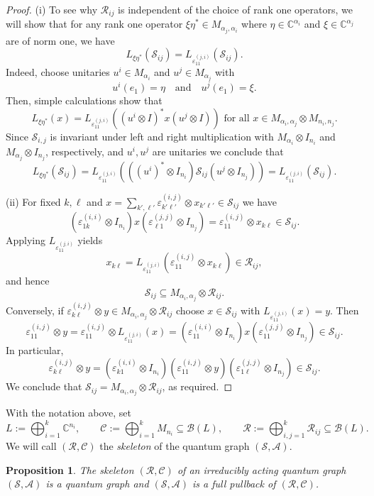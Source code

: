 \documentclass[11pt]{amsart}
\numberwithin{equation}{section}
\theoremstyle{plain}
\newtheorem{proposition}[theorem]{Proposition}
\theoremstyle{definition}
\theoremstyle{remark}
\newcommand{\A}{{\mathcal{A}}}
\newcommand{\B}{{\mathcal{B}}}
\newcommand{\C}{{\mathcal{C}}}
\newcommand{\R}{{\mathcal{R}}}
\renewcommand{\S}{{\mathcal{S}}}
\newcommand{\eps}{\varepsilon}
\def\al{\alpha}
\newcommand{\bC}{\mathbb{C}}
\newcommand{\foral}{\text{ for all }}
\newcommand{\qand}{\quad\text{and}\quad}
\begin{document}
\begin{proof}
(i) To see why $\R_{ij}$ is independent of the choice of rank one operators, we will show that for any rank one operator $ \xi \eta^* \in M_{\al_j,\al_i}$ where $ \eta \in \bC^{\al_i}$ and $ \xi\in \bC^{\al_j}$ are of norm one, we have 
\[
L_{\xi\eta^*}(\S_{ij})= L_{\eps_{11}^{(j,i)}}(\S_{ij}).
\]
Indeed, choose unitaries $ u^i \in M_{\al_i}$ and $u^j \in M_{\al_j}$ with 
\[
u^i (e_1 )=\eta \qand u^j (e_1)=\xi.
\]
Then, simple calculations show that
\[
L_{\xi\eta^*}(x)= L_{\eps_{11}^{(j,i)}}((u^i\otimes I)^*x(u^j\otimes I)) \foral x\in  M_{\alpha_i,\alpha_j}\otimes M_{n_i,n_j}.
\]
Since $\S_{i,j}$ is invariant under left and right multiplication with $ M_{\al_i}\otimes I_{n_i}$ and $M_{\al_j}\otimes I_{n_j}$, respectively, and $u^i, u^j$ are unitaries we conclude that 
\[
L_{\xi \eta^*}(\S_{ij})= L_{\eps_{11}^{(j,i)}}(((u^i)^*\otimes I_{n_i} )\S_{ij}(u^j \otimes I_{n_j}) )=L_{\eps_{11}^{(j,i)}}(\S_{ij}).
\]
\medskip

\noindent
(ii)
For fixed $k,\ell $ and $x=\sum_{k',\ell'}\eps^{(i,j)}_{k'\ell'}\otimes x_{k' \ell'}\in \S_{ij}$ we have
\[
(\eps^{(i,i)}_{1k}\otimes I_{n_i})x(\eps^{(j,j)}_{\ell 1}\otimes I_{n_j})
=\eps^{(i,j)}_{11}\otimes x_{k \ell}\in \S_{ij}.
\]
Applying $L_{\eps_{11}^{(j,i)}}$ yields
\[
x_{k \ell}=L_{\eps_{11}^{(j,i)}}(\eps^{(i,j)}_{11}\otimes x_{k \ell})
\in\R_{ij},
\]
and hence
\[
\S_{ij}\subseteq M_{\alpha_i,\alpha_j}\otimes\R_{ij}.
\]
Conversely, if $\eps^{(i,j)}_{k \ell} \otimes y\in M_{\al_i,\al_j} \otimes \R_{ij}$ choose $x\in \S_{ij}$ with $L_{\eps_{11}^{(j,i)}}(x)=y$.
Then
\[
\eps^{(i,j)}_{11}\otimes y
=
\eps^{(i,j)}_{11}\otimes L_{\eps_{11}^{(j,i)}}(x)
=
(\eps^{(i,i)}_{11}\otimes I_{n_i})x(\eps^{(j,j)}_{11}\otimes I_{n_j}) \in\S_{ij}.
\]
In particular,
\[
\eps^{(i,j)}_{k \ell}\otimes y=(\eps^{(i,i)}_{k1}\otimes I_{n_i})(\eps^{(i,j)}_{11}\otimes y)(\eps^{(j,j)}_{1 \ell}\otimes I_{n_j}) \in \S_{ij}.
\]
We conclude that 
$\S_{ij}
=
M_{\alpha_i,\alpha_j}\otimes\R_{ij}$, as required.
\end{proof}

With the notation above, set
\[
L:=\bigoplus_{i=1}^k \bC^{n_i},
\qquad
\C:=\bigoplus_{i=1}^k M_{n_i}\subseteq \B(L),
\qquad
\R:=\bigoplus_{i,j=1}^k \R_{ij}\subseteq \B(L).
\]
We will call $(\R,\C)$ the \emph{skeleton} of the quantum graph $(\S,\A)$.

\begin{proposition}\label{prop:reduced_qgraph}
The skeleton $(\R,\C)$ of an irreducibly acting quantum graph $(\S,\A)$ is a quantum graph and $(\S,\A)$ is a full pullback of $(\R,\C)$.
\end{proposition}
\end{document}
